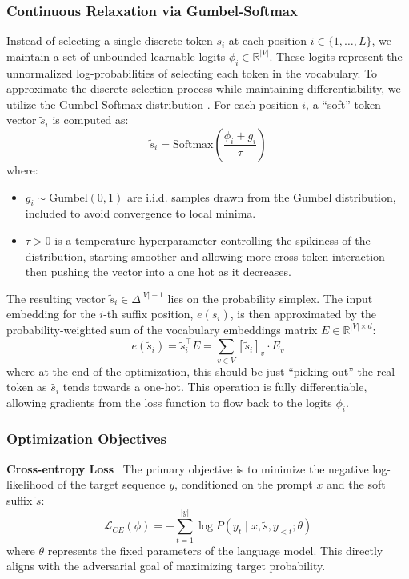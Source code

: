\documentclass[letterpaper]{article} %
\begin{document}
\subsubsection{Continuous Relaxation via Gumbel-Softmax}
Instead of selecting a single discrete token $s_i$ at each position $i \in \{1, \dots, L\}$, we maintain a set of unbounded learnable logits $\phi_i \in \mathbb{R}^{|V|}$. These logits represent the unnormalized log-probabilities of selecting each token in the vocabulary.
To approximate the discrete selection process while maintaining differentiability, we utilize the Gumbel-Softmax distribution \cite{jang2017categoricalreparameterizationgumbelsoftmax}. For each position $i$, a ``soft'' token vector $\tilde{s}_i$ is computed as:
\begin{equation}
    \tilde{s}_i = \text{Softmax}\left(\frac{\phi_i + g_i}{\tau}\right)
\end{equation}
where:
\begin{itemize}
    \item $g_i \sim \text{Gumbel}(0, 1)$ are i.i.d. samples drawn from the Gumbel distribution, included to avoid convergence to local minima.
    \item $\tau > 0$ is a temperature hyperparameter controlling the spikiness of the distribution, starting smoother and allowing more cross-token interaction then pushing the vector into a one hot as it decreases.
\end{itemize}
The resulting vector $\tilde{s}_i \in \Delta^{|V|-1}$ lies on the probability simplex. The input embedding for the $i$-th suffix position, $e(s_i)$, is then approximated by the probability-weighted sum of the vocabulary embeddings matrix $E \in \mathbb{R}^{|V| \times d}$:
\begin{equation}
    e(\tilde{s}_i) = \tilde{s}_i^\top E = \sum_{v \in V} [\tilde{s}_i]_v \cdot E_v
\end{equation}
where at the end of the optimization, this should be just ``picking out'' the real token as $\tilde{s_i}$ tends towards a one-hot. This operation is fully differentiable, allowing gradients from the loss function to flow back to the logits $\phi_i$.
\subsubsection{Optimization Objectives}
\textbf{Cross-entropy Loss} \, The primary objective is to minimize the negative log-likelihood of the target sequence $y$, conditioned on the prompt $x$ and the soft suffix $\tilde{s}$:
\begin{equation}
    \mathcal{L}_{CE}(\phi) = -\sum_{t=1}^{|y|} \log P(y_t \mid x, \tilde{s}, y_{<t}; \theta)
\end{equation}
where $\theta$ represents the fixed parameters of the language model. This directly aligns with the adversarial goal of maximizing target probability.
\end{document}
